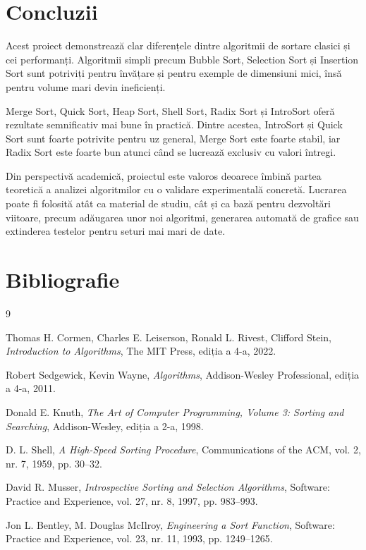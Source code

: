 \documentclass[12pt,a4paper]{article}
\begin{document}
\section{Concluzii}

Acest proiect demonstrează clar diferențele dintre algoritmii de sortare clasici și cei performanți. Algoritmii simpli precum Bubble Sort, Selection Sort și Insertion Sort sunt potriviți pentru învățare și pentru exemple de dimensiuni mici, însă pentru volume mari devin ineficienți.

Merge Sort, Quick Sort, Heap Sort, Shell Sort, Radix Sort și IntroSort oferă rezultate semnificativ mai bune în practică. Dintre acestea, IntroSort și Quick Sort sunt foarte potrivite pentru uz general, Merge Sort este foarte stabil, iar Radix Sort este foarte bun atunci când se lucrează exclusiv cu valori întregi.

Din perspectivă academică, proiectul este valoros deoarece îmbină partea teoretică a analizei algoritmilor cu o validare experimentală concretă. Lucrarea poate fi folosită atât ca material de studiu, cât și ca bază pentru dezvoltări viitoare, precum adăugarea unor noi algoritmi, generarea automată de grafice sau extinderea testelor pentru seturi mai mari de date.

\section{Bibliografie}

\begin{thebibliography}{9}

Thomas H. Cormen, Charles E. Leiserson, Ronald L. Rivest, Clifford Stein,
\textit{Introduction to Algorithms},
The MIT Press, ediția a 4-a, 2022.

Robert Sedgewick, Kevin Wayne,
\textit{Algorithms},
Addison-Wesley Professional, ediția a 4-a, 2011.

Donald E. Knuth,
\textit{The Art of Computer Programming, Volume 3: Sorting and Searching},
Addison-Wesley, ediția a 2-a, 1998.

D. L. Shell,
\textit{A High-Speed Sorting Procedure},
Communications of the ACM, vol. 2, nr. 7, 1959, pp. 30--32.

David R. Musser,
\textit{Introspective Sorting and Selection Algorithms},
Software: Practice and Experience, vol. 27, nr. 8, 1997, pp. 983--993.

Jon L. Bentley, M. Douglas McIlroy,
\textit{Engineering a Sort Function},
Software: Practice and Experience, vol. 23, nr. 11, 1993, pp. 1249--1265.

\end{thebibliography}
\end{document}
